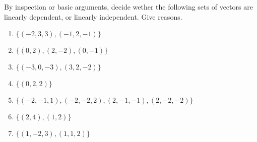 






\sectionExercises



\begin{exercise}  
By inspection or basic arguments, decide wether the following sets of vectors are linearly dependent, or linearly independent.  Give reasons.

\begin{enumerate}
\item \(\{(-2,3,3), (-1,2,-1)\}\)

\item \(\{(0,2), (2,-2), (0,-1)\}\)

\item \(\{(-3,0,-3), (3,2,-2)\}\)

\item \(\{(0,2,2)\}\)


\item \(\{(-2,-1,1), (-2,-2,2), (2,-1,-1), (2,-2,-2)\}\)

\item \(\{(2,4), (1,2)\}\)

\item \(\{( 1,-2,3), (1,1,2)\}\)

\end{enumerate}
\end{exercise}








